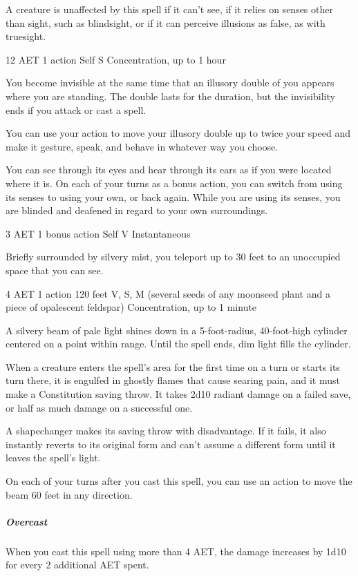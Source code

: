 A creature is unaffected by this spell if it can't see, if it relies on senses other than sight, such as blindsight, or if it can perceive illusions as false, as with truesight.

\label{spell:mislead}
{12 AET}
{1 action}
{Self}
{S}
{Concentration, up to 1 hour}

You become invisible at the same time that an illusory double of you appears where you are standing. The double lasts for the duration, but the invisibility ends if you attack or cast a spell.

You can use your action to move your illusory double up to twice your speed and make it gesture, speak, and behave in whatever way you choose.

You can see through its eyes and hear through its ears as if you were located where it is. On each of your turns as a bonus action, you can switch from using its senses to using your own, or back again. While you are using its senses, you are blinded and deafened in regard to your own surroundings.

\label{spell:misty-step}
{3 AET}
{1 bonus action}
{Self}
{V}
{Instantaneous}

Briefly surrounded by silvery mist, you teleport up to 30 feet to an unoccupied space that you can see.

\label{spell:moonbeam}
{4 AET}
{1 action}
{120 feet}
{V, S, M (several seeds of any moonseed plant and a piece of opalescent feldspar)}
{Concentration, up to 1 minute}

A silvery beam of pale light shines down in a 5-foot-radius, 40-foot-high cylinder centered on a point within range. Until the spell ends, dim light fills the cylinder.

When a creature enters the spell's area for the first time on a turn or starts its turn there, it is engulfed in ghostly flames that cause searing pain, and it must make a Constitution saving throw. It takes 2d10 radiant damage on a failed save, or half as much damage on a successful one.

A shapechanger makes its saving throw with disadvantage. If it fails, it also instantly reverts to its original form and can't assume a different form until it leaves the spell's light.

On each of your turns after you cast this spell, you can use an action to move the beam 60 feet in any direction.
\subparagraph*{Overcast} When you cast this spell using more than 4 AET, the damage increases by 1d10 for every 2 additional AET spent.

